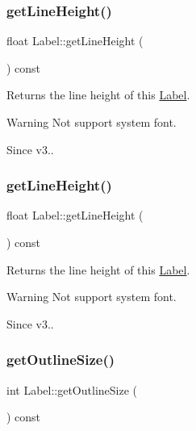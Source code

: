 \subsubsection{\texorpdfstring{get\+Line\+Height()}{getLineHeight()}\hspace{0.1cm}{\footnotesize\ttfamily [1/2]}}
{\footnotesize\ttfamily float Label\+::get\+Line\+Height (\begin{DoxyParamCaption}{ }\end{DoxyParamCaption}) const}

Returns the line height of this \hyperlink{classLabel}{Label}. \begin{DoxyWarning}{Warning}
Not support system font. 
\end{DoxyWarning}
\begin{DoxySince}{Since}
v3.. 
\end{DoxySince}
\mbox{\label{classLabel_afec75d9e7948756cee3ed98c4a94b6b4}} 
\subsubsection{\texorpdfstring{get\+Line\+Height()}{getLineHeight()}\hspace{0.1cm}{\footnotesize\ttfamily [2/2]}}
{\footnotesize\ttfamily float Label\+::get\+Line\+Height (\begin{DoxyParamCaption}{ }\end{DoxyParamCaption}) const}

Returns the line height of this \hyperlink{classLabel}{Label}. \begin{DoxyWarning}{Warning}
Not support system font. 
\end{DoxyWarning}
\begin{DoxySince}{Since}
v3.. 
\end{DoxySince}
\mbox{\label{classLabel_a21b42e1e698b718c6d90b61b7794de43}} 
\subsubsection{\texorpdfstring{get\+Outline\+Size()}{getOutlineSize()}\hspace{0.1cm}{\footnotesize\ttfamily [1/2]}}
{\footnotesize\ttfamily int Label\+::get\+Outline\+Size (\begin{DoxyParamCaption}{ }\end{DoxyParamCaption}) const\hspace{0.3cm}{\ttfamily [inline]}}

